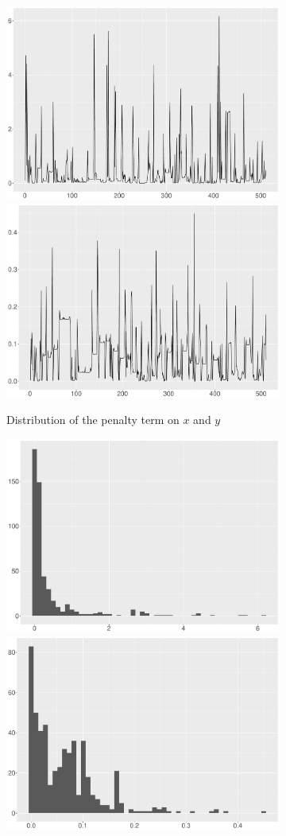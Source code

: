 \begin{figure}
    \centering
    \begin{subfigure}{\textwidth}
    \centering
    \includegraphics[width=0.45\linewidth]{Chapters/02TractorSplineTheory/plot/ggplot/ggRealdataXPenaltyLine.pdf}
    \includegraphics[width=0.45\linewidth]{Chapters/02TractorSplineTheory/plot/ggplot/ggRealdataYPenaltyLine.pdf}
    \caption{Distribution of the penalty term on $x$ and $y$}\label{penaltyxyggXYLine}
    \end{subfigure}
    \begin{subfigure}{\textwidth}
    \centering
    \includegraphics[width=0.45\linewidth]{Chapters/02TractorSplineTheory/plot/ggplot/ggRealdataXPenaltyHist.pdf}
    \includegraphics[width=0.45\linewidth]{Chapters/02TractorSplineTheory/plot/ggplot/ggRealdataYPenaltyHist.pdf}

\end{subfigure}
\end{figure}
